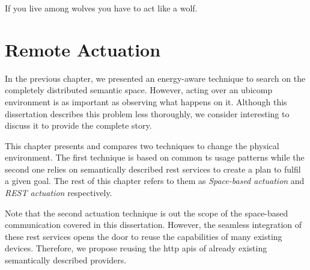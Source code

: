 
\begin{savequote}[50mm]
If you live among wolves you have to act like a wolf.
\end{savequote}


\chapter{Remote Actuation}
\label{cha:actuate}


\newcommand{\restdesc}{\emph{RESTdesc}}
\newcommand{\spaceActuation}{\emph{Space-based actuation}}
\newcommand{\restActuation}{\emph{REST actuation}}
\newcommand{\hybridActuation}{\emph{Hybrid actuation}}


\ifpdf
    \graphicspath{{\pathchapsix/figures/PNG/}{\pathchapsix/figures/PDF/}{\pathchapsix/figures/JPG/}{\pathchapsix/figures/}}
\else
    \graphicspath{{\pathchapsix/figures/EPS/}{\pathchapsix/figures/}}
\fi




In the previous chapter, we presented an energy-aware technique to search on the completely distributed semantic space. %
However, acting over an \ac{ubicomp} environment is as important as observing what happens on it.
Although this dissertation describes this problem less thoroughly, we consider interesting to discuss it to provide the complete story. %

\bigskip

This chapter presents and compares two techniques to change the physical environment.
The first technique is based on common \ac{ts} usage patterns while the second one relies on semantically described \ac{rest} services to create a plan to fulfil a given goal.
The rest of this chapter refers to them as \spaceActuation{} and \restActuation{} respectively.

Note that the second actuation technique is out the scope of the space-based communication covered in this dissertation.
However, the seamless integration of these \ac{rest} services opens the door to reuse the capabilities of many existing devices.
Therefore, we propose reusing the \acs{http} \acsp{api} of already existing semantically described providers.

